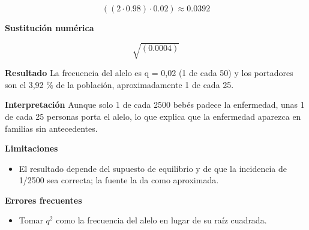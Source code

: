 \documentclass{book}
\begin{document}
\begin{tcolorbox}[title={Problema resuelto}, studiumworked, breakable]
\begin{enumerate}
\[
\left(\left(2\cdot 0.98\right)\cdot 0.02\right) \approx 0.0392
\]
\end{enumerate}

\noindent\textbf{Sustitución numérica}

\[
\sqrt{\left(0.0004\right)}
\]

\noindent\textbf{Resultado}
La frecuencia del alelo es q = 0,02 (1 de cada 50) y los portadores son el 3,92 \% de la población, aproximadamente 1 de cada 25.


\noindent\textbf{Interpretación}
Aunque solo 1 de cada 2500 bebés padece la enfermedad, unas 1 de cada 25 personas porta el alelo, lo que explica que la enfermedad aparezca en familias sin antecedentes.


\noindent\textbf{Limitaciones}
\begin{itemize}
\item El resultado depende del supuesto de equilibrio y de que la incidencia de 1/2500 sea correcta; la fuente la da como aproximada.
\end{itemize}

\noindent\textbf{Errores frecuentes}
\begin{itemize}
\item Tomar \(q^{2}\) como la frecuencia del alelo en lugar de su raíz cuadrada.
\end{itemize}
\end{tcolorbox}
\end{document}
